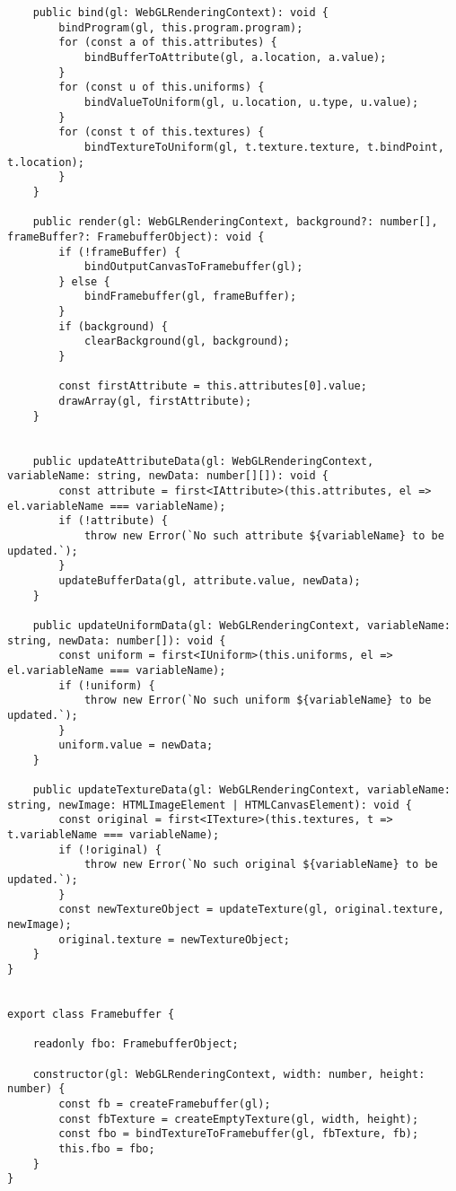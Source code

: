 \begin{lstlisting}
    public bind(gl: WebGLRenderingContext): void {
        bindProgram(gl, this.program.program);
        for (const a of this.attributes) {
            bindBufferToAttribute(gl, a.location, a.value);
        }
        for (const u of this.uniforms) {
            bindValueToUniform(gl, u.location, u.type, u.value);
        }
        for (const t of this.textures) {
            bindTextureToUniform(gl, t.texture.texture, t.bindPoint, t.location);
        }
    }

    public render(gl: WebGLRenderingContext, background?: number[], frameBuffer?: FramebufferObject): void {
        if (!frameBuffer) {
            bindOutputCanvasToFramebuffer(gl);
        } else {
            bindFramebuffer(gl, frameBuffer);
        }
        if (background) {
            clearBackground(gl, background);
        }

        const firstAttribute = this.attributes[0].value;
        drawArray(gl, firstAttribute);
    }


    public updateAttributeData(gl: WebGLRenderingContext, variableName: string, newData: number[][]): void {
        const attribute = first<IAttribute>(this.attributes, el => el.variableName === variableName);
        if (!attribute) {
            throw new Error(`No such attribute ${variableName} to be updated.`);
        }
        updateBufferData(gl, attribute.value, newData);
    }

    public updateUniformData(gl: WebGLRenderingContext, variableName: string, newData: number[]): void {
        const uniform = first<IUniform>(this.uniforms, el => el.variableName === variableName);
        if (!uniform) {
            throw new Error(`No such uniform ${variableName} to be updated.`);
        }
        uniform.value = newData;
    }

    public updateTextureData(gl: WebGLRenderingContext, variableName: string, newImage: HTMLImageElement | HTMLCanvasElement): void {
        const original = first<ITexture>(this.textures, t => t.variableName === variableName);
        if (!original) {
            throw new Error(`No such original ${variableName} to be updated.`);
        }
        const newTextureObject = updateTexture(gl, original.texture, newImage);
        original.texture = newTextureObject;
    }
}


export class Framebuffer {

    readonly fbo: FramebufferObject;

    constructor(gl: WebGLRenderingContext, width: number, height: number) {
        const fb = createFramebuffer(gl);
        const fbTexture = createEmptyTexture(gl, width, height);
        const fbo = bindTextureToFramebuffer(gl, fbTexture, fb);
        this.fbo = fbo;
    }
}





\end{lstlisting}
